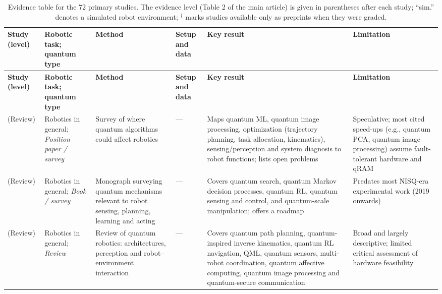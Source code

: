 \documentclass[acmsmall,screen,review]{acmart}
\begin{document}
{\scriptsize
\begin{longtable}{@{}>{\raggedright\arraybackslash}p{0.120\dimexpr\linewidth-12\tabcolsep\relax}>{\raggedright\arraybackslash}p{0.140\dimexpr\linewidth-12\tabcolsep\relax}>{\raggedright\arraybackslash}p{0.180\dimexpr\linewidth-12\tabcolsep\relax}>{\raggedright\arraybackslash}p{0.170\dimexpr\linewidth-12\tabcolsep\relax}>{\raggedright\arraybackslash}p{0.210\dimexpr\linewidth-12\tabcolsep\relax}>{\raggedright\arraybackslash}p{0.180\dimexpr\linewidth-12\tabcolsep\relax}@{}}
\caption{Evidence table for the 72 primary studies. The evidence level (Table 2 of the main article) is given in parentheses after each study; ``sim.'' denotes a simulated robot environment; $^\dagger$ marks studies available only as preprints when they were graded.}\label{tab:evidence}\\
\toprule
\textbf{Study (level)} & \textbf{Robotic task; quantum type} & \textbf{Method} & \textbf{Setup and data} & \textbf{Key result} & \textbf{Limitation} \\ \midrule
\endfirsthead
\toprule
\textbf{Study (level)} & \textbf{Robotic task; quantum type} & \textbf{Method} & \textbf{Setup and data} & \textbf{Key result} & \textbf{Limitation} \\ \midrule
\endhead
\bottomrule
\endfoot
\citet{Petschnigg2019} (Review) & Robotics in general; \emph{Position paper / survey} & Survey of where quantum algorithms could affect robotics & --- & Maps quantum ML, quantum image processing, optimization (trajectory planning, task allocation, kinematics), sensing/perception and system diagnosis to robot functions; lists open problems & Speculative; most cited speed-ups (e.g., quantum PCA, quantum image processing) assume fault-tolerant hardware and qRAM \\
\citet{Tandon2017} (Review) & Robotics in general; \emph{Book / survey} & Monograph surveying quantum mechanisms relevant to robot sensing, planning, learning and acting & --- & Covers quantum search, quantum Markov decision processes, quantum RL, quantum sensing and control, and quantum-scale manipulation; offers a roadmap & Predates most NISQ-era experimental work (2019 onwards) \\
\citet{Yan2024} (Review) & Robotics in general; \emph{Review} & Review of quantum robotics: architectures, perception and robot--environment interaction & --- & Covers quantum path planning, quantum-inspired inverse kinematics, quantum RL navigation, QML, quantum sensors, multi-robot coordination, quantum affective computing, quantum image processing and quantum-secure communication & Broad and largely descriptive; limited critical assessment of hardware feasibility \\

\end{longtable}}
\end{document}
